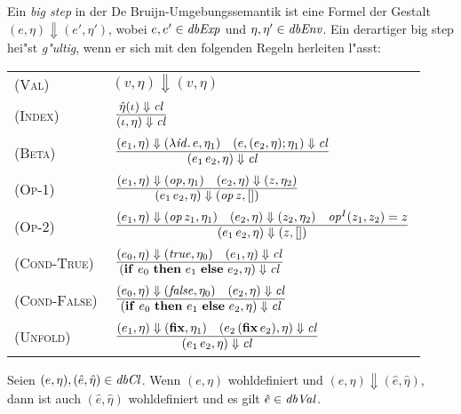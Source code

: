 \documentclass[12pt,fleqn]{article}
\newcommand{\RN}[1]{\mbox{\textsc{(#1)}}}
\newcommand{\cl}{\name{cl}}
\begin{document}
\begin{definition}
Ein {\em big step} in der De Bruijn-Umgebungssemantik ist eine Formel der Gestalt $(e,\eta) \Downarrow (e',\eta')$,
wobei $e,e'\in{\text{\it dbExp\/}}$ und $\eta,\eta'\in{\text{\it dbEnv\/}}$. Ein derartiger big step hei"st {\em g"ultig}, wenn er sich mit den
folgenden Regeln herleiten l"asst: \\[5mm]
\begin{tabular}{ll}
  \RN{Val}        & $(v,\eta) \Downarrow (v,\eta)$ \\[3mm]
  \RN{Index}      & $\regel{\hat{\eta}(\iota) \Downarrow \cl}
                           {(\iota,\eta) \Downarrow \cl}$ \\[3mm]
  \RN{Beta}       & $\regel{(e_1,\eta) \Downarrow (\abstr{\id}{e},\eta_1)
                            \quad (e,(e_2,\eta);\eta_1) \Downarrow \cl}
                           {(\app{e_1}{e_2},\eta) \Downarrow \cl}$ \\[3mm]
  \RN{Op-1}       & $\regel{(e_1,\eta) \Downarrow (\op,\eta_1) \quad (e_2,\eta) \Downarrow (z,\eta_2)}
                           {(\app{e_1}{e_2},\eta) \Downarrow (\app{\op}{z},[])}$ \\[3mm]
  \RN{Op-2}       & $\regel{(e_1,\eta) \Downarrow (\app{\op}{z_1},\eta_1)
                            \quad (e_2,\eta) \Downarrow (z_2,\eta_2)
                            \quad \op^I(z_1,z_2) = z}
                           {(\app{e_1}{e_2},\eta) \Downarrow (z,[])}$ \\[3mm]
  \RN{Cond-True}  & $\regel{(e_0,\eta) \Downarrow (\true,\eta_0) \quad (e_1,\eta) \Downarrow \cl}
                           {(\bifte{e_0}{e_1}{e_2},\eta) \Downarrow \cl}$ \\[3mm]
  \RN{Cond-False} & $\regel{(e_0,\eta) \Downarrow (\false,\eta_0) \quad (e_2,\eta) \Downarrow \cl}
                           {(\bifte{e_0}{e_1}{e_2},\eta) \Downarrow \cl}$ \\[3mm]
  \RN{Unfold}     & $\regel{(e_1,\eta) \Downarrow (\bfix,\eta_1)
                            \quad (\app{e_2}{(\app{\bfix}{e_2})},\eta) \Downarrow \cl}
                           {(\app{e_1}{e_2},\eta) \Downarrow \cl}$
\end{tabular}
\end{definition}

\begin{lemma}
  Seien $(e,\eta),(\hat{e},\hat{\eta})\in{\text{\it dbCl\/}}$. Wenn $(e,\eta)$ wohldefiniert und
  $(e,\eta) \Downarrow (\hat{e},\hat{\eta})$, dann ist auch $(\hat{e},\hat{\eta})$
  wohldefiniert und es gilt $\hat{e}\in{\text{\it dbVal\/}}$.
\end{lemma}
\end{document}
